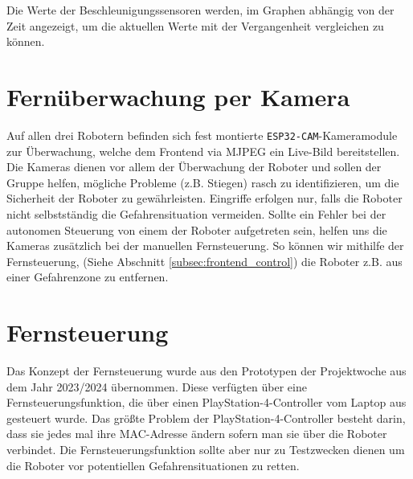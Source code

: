 Die Werte der Beschleunigungssensoren werden,
im Graphen abhängig von der Zeit angezeigt, 
um die aktuellen Werte mit der Vergangenheit vergleichen zu können.

\section{Fernüberwachung per Kamera}
\label{subsec:frontend_cam_stream}
Auf allen drei Robotern befinden sich fest montierte
\texttt{ESP32-CAM}-Kameramodule zur Überwachung,
welche dem Frontend via MJPEG ein Live-Bild bereitstellen.
%
Die Kameras dienen vor allem der Überwachung der Roboter und sollen der Gruppe helfen,
mögliche Probleme (z.B. Stiegen) rasch zu identifizieren,
um die Sicherheit der Roboter zu gewährleisten.
%
Eingriffe erfolgen nur, falls die Roboter nicht selbstständig die Gefahrensituation vermeiden.
%
Sollte ein Fehler bei der autonomen Steuerung von einem der Roboter aufgetreten sein,
helfen uns die Kameras zusätzlich bei der manuellen Fernsteuerung.
%
So können wir mithilfe der Fernsteuerung, (Siehe Abschnitt \ref{subsec:frontend_control})
die Roboter z.B. aus einer Gefahrenzone zu entfernen.

\section{Fernsteuerung}
\label{subsec:frontend_control}
Das Konzept der Fernsteuerung wurde aus den Prototypen der Projektwoche aus dem Jahr 2023/2024 übernommen.
%
Diese verfügten über eine Fernsteuerungsfunktion, 
die über einen PlayStation-4-Controller vom Laptop aus gesteuert wurde. 
%
Das größte Problem der PlayStation-4-Controller besteht darin, dass sie jedes mal ihre MAC-Adresse ändern sofern
man sie über die Roboter verbindet.  
%
Die Fernsteuerungsfunktion sollte aber nur zu Testzwecken dienen um die Roboter 
vor potentiellen Gefahrensituationen zu retten. 

